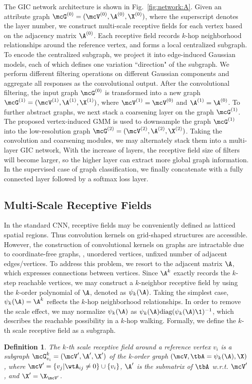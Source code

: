 \documentclass[letterpaper]{article} \usepackage{aaai19}  \usepackage{times}  \usepackage{helvet}  \usepackage{courier}  \usepackage{url}  \usepackage{graphicx}  \frenchspacing  \setlength{\pdfpagewidth}{8.5in}  \setlength{\pdfpageheight}{11in}
\newtheorem{defn}{Definition}
\begin{document}
The GIC network architecture is shown in Fig.~\ref{fig:network:A}. Given an attribute graph $\mcG^{(0)}=(\mcV^{(0)},\A^{(0)},\X^{(0)})$, where the superscript denotes the layer number, we construct multi-scale receptive fields for each vertex based on the adjacency matrix $\A^{(0)}$. Each receptive field records $k$-hop neighborhood relationships around the reference vertex, and forms a local centralized subgraph. To encode the centralized subgraph, we project it into edge-induced Gaussian models, each of which defines one variation ``direction" of the subgraph. We perform different filtering operations on different Gaussian components and aggregate all responses as the convolutional output. After the convolutional filtering, the input graph $\mcG^{(0)}$ is transformed into a new graph $\mcG^{(1)}=(\mcV^{(1)},\A^{(1)},\X^{(1)})$, where $\mcV^{(1)}=\mcV^{(0)}$ and $\A^{(1)}=\A^{(0)}$. To further abstract graphs, we next stack a coarsening layer on the graph $\mcG^{(1)}$. The proposed vertex-induced GMM is used to downsample the graph $\mcG^{(1)}$ into the low-resolution graph $\mcG^{(2)}=(\mcV^{(2)},\A^{(2)},\X^{(2)})$. Taking the convolution and coarsening modules, we may alternately stack them into a multi-layer GIC network, With the increase of layers, the receptive field size of filters will become larger, so the higher layer can extract more global graph information. In the supervised case of graph classification, we finally concatenate with a fully connected layer followed by a softmax loss layer.

\subsection{Multi-Scale Receptive Fields} 

In the standard CNN, receptive fields may be conveniently defined as latticed spatial regions. Thus convolution kernels on grid-shaped structures are accessible. However, the construction of convolutional kernels on graphs are intractable due to coordinate-free graphs, \eg, unordered vertices, unfixed number of adjacent edges/vertices. To address this problem, we resort to the adjacent matrix $\A$, which expresses connections between vertices. Since $\A^k$ exactly records the $k$-step reachable vertices, we may construct a $k$-neighbor receptive field by using the $k$-order polynomial of $\A$, denoted as $\psi_k(\A)$. Taking the simplest case, $\psi_k(\A)=\A^k$ reflects the $k$-hop neighborhood relationships. In order to remove the scale effect, we may normalize $\psi_k(\A)$ as $\psi_k(\A) \text{diag} (\psi_k(\A)\1)^{-1}$, which describes the reachable possibility in a $k$-hop walking. Formally, we define the $k$-th scale receptive field as a subgraph.
\begin{defn}\label{def:receptive}
	The $k$-th scale receptive field around a reference vertex $v_i$ is a subgraph $\mcG_{v_i}^k=(\mcV',\A',\X')$ of the k-order graph $(\mcV, \tbA=\psi_k(\A), \X)$, where $\mcV'=\{v_j|\wtA_{ij}\neq 0\}\cup\{v_i\}$, $\A'$ is the submatrix of $\tbA$ w.r.t. $\mcV'$, and $\X'=\X_{\mcV'}$.
\end{defn}
\end{document}
